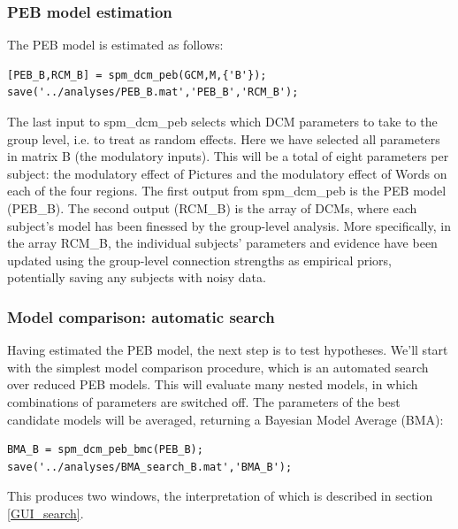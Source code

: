 \documentclass{article}
\begin{document}
\subsubsection{PEB model estimation}
The PEB model is estimated as follows:

\begin{lstlisting}[style=Matlab-editor,caption=PEB estimation]
[PEB_B,RCM_B] = spm_dcm_peb(GCM,M,{'B'});
save('../analyses/PEB_B.mat','PEB_B','RCM_B');
\end{lstlisting}

The last input to spm\_dcm\_peb selects which DCM parameters to take to the group level, i.e. to treat as random effects. Here we have selected all parameters in matrix B (the modulatory inputs). This will be a total of eight parameters per subject: the modulatory effect of Pictures and the modulatory effect of Words on each of the four regions. The first output from spm\_dcm\_peb is the PEB model (PEB\_B). The second output (RCM\_B) is the array of DCMs, where each subject's model has been finessed by the group-level analysis. More specifically, in the array RCM\_B, the individual subjects' parameters and evidence have been updated using the group-level connection strengths as empirical priors, potentially saving any subjects with noisy data.

\subsubsection{Model comparison: automatic search}

Having estimated the PEB model, the next step is to test hypotheses. We'll start with the simplest model comparison procedure, which is an automated search over reduced PEB models. This will evaluate many nested models, in which combinations of parameters are switched off. The parameters of the best candidate models will be averaged, returning a Bayesian Model Average (BMA):

\begin{lstlisting}[style=Matlab-editor,caption=Automatic PEB search]
BMA_B = spm_dcm_peb_bmc(PEB_B);
save('../analyses/BMA_search_B.mat','BMA_B');          
\end{lstlisting}

This produces two windows, the interpretation of which is described in section \ref{GUI_search}.
\end{document}
